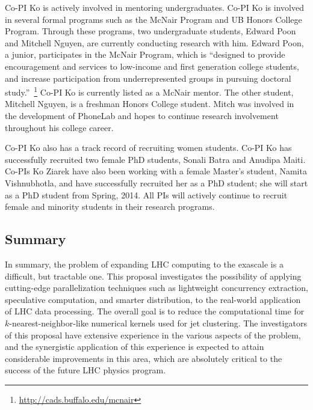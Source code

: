 \documentclass[times,11pt]{article}
\begin{document}
Co-PI Ko is actively involved in mentoring undergraduates. Co-PI Ko is involved
in several formal programs such as the McNair Program and UB Honors College
Program. Through these programs, two undergraduate students, Edward Poon and
Mitchell Nguyen, are currently conducting research with him. Edward Poon, a
junior, participates in the McNair Program, which is ``designed to provide
encouragement and services to low-income and first generation college students,
and increase participation from underrepresented groups in pursuing doctoral
study.''~\footnote{\url{http://cads.buffalo.edu/mcnair}} Co-PI Ko is currently
listed as a McNair mentor. The other student, Mitchell Nguyen, is a freshman
Honors College student. Mitch was involved in the development of PhoneLab and
hopes to continue research involvement throughout his college career.

Co-PI Ko also has a track record of recruiting women students. Co-PI Ko has
successfully recruited two female PhD students, Sonali Batra and Anudipa
Maiti. Co-PIs Ko Ziarek have also been working with a female Master's student,
Namita Vishnubhotla, and have successfully recruited her as a PhD student; she
will start as a PhD student from Spring, 2014. All PIs will actively continue to
recruit female and minority students in their research programs.

\subsection{Summary}

In summary, the problem of expanding LHC computing to the exascale is
a difficult, but tractable one. This proposal investigates the
possibility of applying cutting-edge parallelization techniques such
as lightweight concurrency extraction, speculative computation, and
smarter distribution, to the
real-world application of LHC data processing.
The overall goal is to reduce the computational time for
$k$-nearest-neighbor-like numerical kernels used for jet
clustering. The investigators of this
proposal have extensive experience in the various aspects of the
problem, and the synergistic application of this experience is
expected to attain considerable improvements in this area, which
are absolutely critical to the success of the future LHC physics
program. 



\newpage
{}
\renewcommand{\thepage} {A--\arabic{page}}



{}
%
\end{document}
